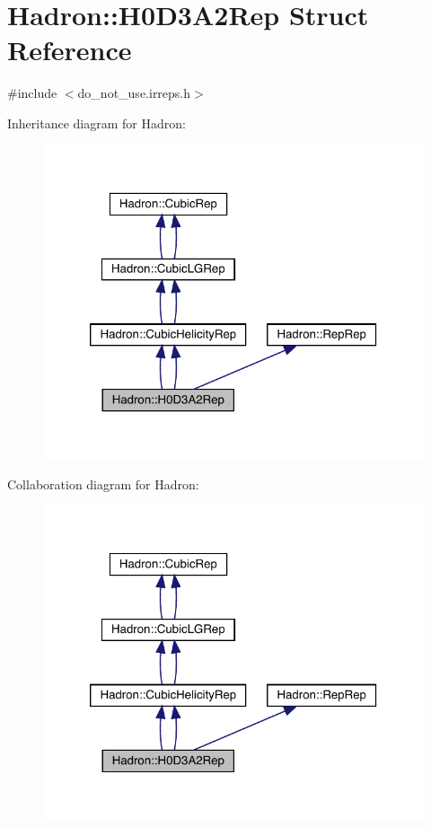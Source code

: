 \hypertarget{structHadron_1_1H0D3A2Rep}{}\section{Hadron\+:\+:H0\+D3\+A2\+Rep Struct Reference}
\label{structHadron_1_1H0D3A2Rep}


{\ttfamily \#include $<$do\+\_\+not\+\_\+use.\+irreps.\+h$>$}



Inheritance diagram for Hadron\+:\nopagebreak
\begin{figure}[H]
\begin{center}
\leavevmode
\includegraphics[width=320pt]{de/de3/structHadron_1_1H0D3A2Rep__inherit__graph}
\end{center}
\end{figure}


Collaboration diagram for Hadron\+:\nopagebreak
\begin{figure}[H]
\begin{center}
\leavevmode
\includegraphics[width=320pt]{d4/d39/structHadron_1_1H0D3A2Rep__coll__graph}
\end{center}
\end{figure}
